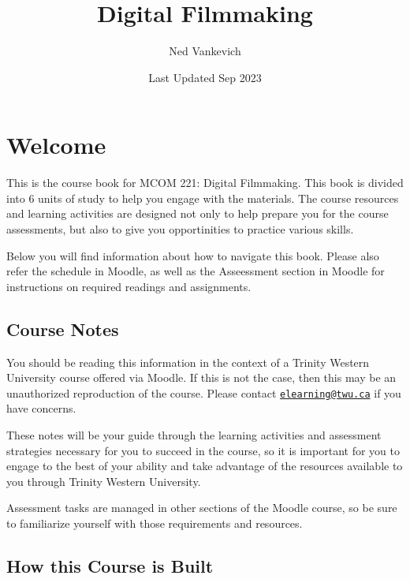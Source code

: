 \documentclass[
]{book}
\title{Digital Filmmaking}
\author{Ned Vankevich}
\date{Last Updated Sep 2023}
\begin{document}
\maketitle

{
\setcounter{tocdepth}{1}
\tableofcontents
}
\hypertarget{welcome}{%
\chapter*{Welcome}\label{welcome}}

This is the course book for MCOM 221: Digital Filmmaking. This book is divided into 6 units of study to help you engage with the materials. The course resources and learning activities are designed not only to help prepare you for the course assessments, but also to give you opportinities to practice various skills.

Below you will find information about how to navigate this book. Please also refer the schedule in Moodle, as well as the Asseessment section in Moodle for instructions on required readings and assignments.

\hypertarget{course-notes}{%
\section*{Course Notes}\label{course-notes}}

You should be reading this information in the context of a Trinity Western University course offered via Moodle. If this is not the case, then this may be an unauthorized reproduction of the course. Please contact \href{mailto:elearning@twu.ca}{\nolinkurl{elearning@twu.ca}} if you have concerns.

These notes will be your guide through the learning activities and assessment strategies necessary for you to succeed in the course, so it is important for you to engage to the best of your ability and take advantage of the resources available to you through Trinity Western University.

Assessment tasks are managed in other sections of the Moodle course, so be sure to familiarize yourself with those requirements and resources.

\hypertarget{how-this-course-is-built}{%
\section*{How this Course is Built}\label{how-this-course-is-built}}
\end{document}
